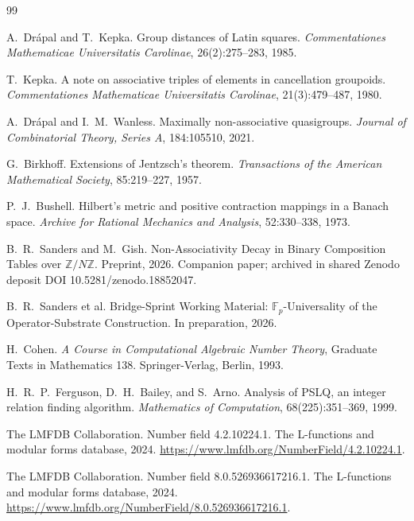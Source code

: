 \documentclass[11pt,reqno]{amsart}
\theoremstyle{plain}
\theoremstyle{definition}
\theoremstyle{remark}
\newcommand{\F}{\mathbb{F}}
\begin{document}
\begin{thebibliography}{99}

A.~Dr\'{a}pal and T.~Kepka.
\newblock Group distances of Latin squares.
\newblock \emph{Commentationes Mathematicae Universitatis Carolinae},
26(2):275--283, 1985.

T.~Kepka.
\newblock A note on associative triples of elements in cancellation groupoids.
\newblock \emph{Commentationes Mathematicae Universitatis Carolinae},
21(3):479--487, 1980.

A.~Dr\'{a}pal and I.~M.~Wanless.
\newblock Maximally non-associative quasigroups.
\newblock \emph{Journal of Combinatorial Theory, Series A},
184:105510, 2021.

G.~Birkhoff.
\newblock Extensions of {J}entzsch's theorem.
\newblock \emph{Transactions of the American Mathematical Society},
85:219--227, 1957.

P.~J.~Bushell.
\newblock Hilbert's metric and positive contraction mappings in a {Banach} space.
\newblock \emph{Archive for Rational Mechanics and Analysis},
52:330--338, 1973.

B.~R.~Sanders and M.~Gish.
\newblock Non-Associativity Decay in Binary Composition Tables over
$\mathbb{Z}/N\mathbb{Z}$.
\newblock Preprint, 2026.
\newblock Companion paper; archived in shared Zenodo deposit DOI
10.5281/zenodo.18852047.

B.~R.~Sanders et al.
\newblock Bridge-Sprint Working Material: $\F_{p}$-Universality of the
Operator-Substrate Construction.
\newblock In preparation, 2026.

H.~Cohen.
\newblock \emph{A Course in Computational Algebraic Number Theory},
Graduate Texts in Mathematics 138.
\newblock Springer-Verlag, Berlin, 1993.

H.~R.~P.~Ferguson, D.~H.~Bailey, and S.~Arno.
\newblock Analysis of {PSLQ}, an integer relation finding algorithm.
\newblock \emph{Mathematics of Computation}, 68(225):351--369, 1999.

The {LMFDB} Collaboration.
\newblock Number field 4.2.10224.1.
\newblock The {L}-functions and modular forms database, 2024.
\newblock \url{https://www.lmfdb.org/NumberField/4.2.10224.1}.

The {LMFDB} Collaboration.
\newblock Number field 8.0.526936617216.1.
\newblock The {L}-functions and modular forms database, 2024.
\newblock \url{https://www.lmfdb.org/NumberField/8.0.526936617216.1}.

\end{thebibliography}
\end{document}
